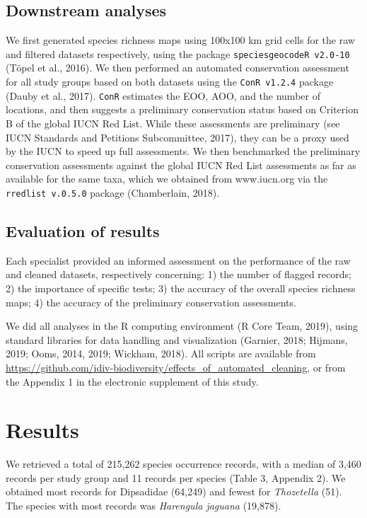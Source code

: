 \documentclass[
  12pt,
]{article}
\begin{document}
\hypertarget{downstream-analyses}{%
\subsection{Downstream analyses}\label{downstream-analyses}}

We first generated species richness maps using 100x100 km grid cells for the raw and filtered datasets respectively, using the package \texttt{speciesgeocodeR\ v2.0-10} (Töpel et al., 2016). We then performed an automated conservation assessment for all study groups based on both datasets using the \texttt{ConR\ v1.2.4} package (Dauby et al., 2017). \texttt{ConR} estimates the EOO, AOO, and the number of locations, and then suggests a preliminary conservation status based on Criterion B of the global IUCN Red List. While these assessments are preliminary (see IUCN Standards and Petitions Subcommittee, 2017), they can be a proxy used by the IUCN to speed up full assessments. We then benchmarked the preliminary conservation assessments against the global IUCN Red List assessments as far as available for the same taxa, which we obtained from www.iucn.org via the \texttt{rredlist\ v.0.5.0} package (Chamberlain, 2018).

\hypertarget{evaluation-of-results}{%
\subsection{Evaluation of results}\label{evaluation-of-results}}

Each specialist provided an informed assessment on the performance of the raw and cleaned datasets, respectively concerning: 1) the number of flagged records; 2) the importance of specific tests; 3) the accuracy of the overall species richness maps; 4) the accuracy of the preliminary conservation assessments.

We did all analyses in the R computing environment (R Core Team, 2019), using standard libraries for data handling and visualization (Garnier, 2018; Hijmans, 2019; Ooms, 2014, 2019; Wickham, 2018). All scripts are available from \url{https://github.com/idiv-biodiversity/effects_of_automated_cleaning}, or from the Appendix 1 in the electronic supplement of this study.

\hypertarget{results}{%
\section{Results}\label{results}}

We retrieved a total of 215,262 species occurrence records, with a median of 3,460 records per study group and 11 records per species (Table 3, Appendix 2). We obtained most records for Dipsadidae (64,249) and fewest for \emph{Thozetella} (51). The species with most records was \emph{Harengula jaguana} (19,878).
\end{document}
